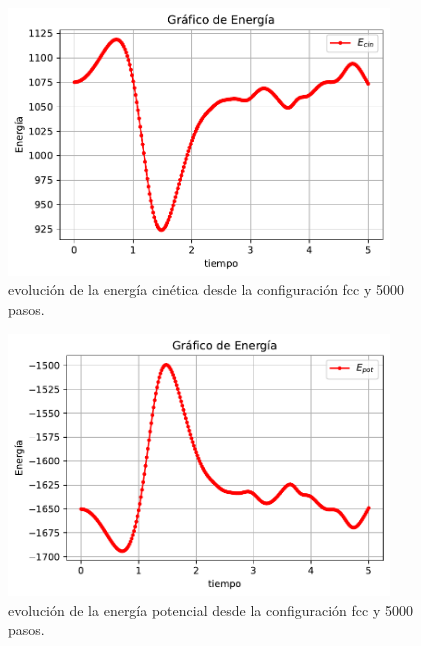 \documentclass[11pt]{article} %
\begin{document}
\begin{figure}[h!] \centering
	\includegraphics[width=0.9\textwidth]{../../Graficas/Ecin-equilibra.pdf}
	\caption{evolución de la energía cinética desde la configuración fcc y 5000 pasos.}
	\label{Fig:02}
\end{figure}	

\begin{figure}[h!] \centering
	\includegraphics[width=0.9\textwidth]{../../Graficas/Epot-equilibra.pdf}
	\caption{evolución de la energía potencial desde la configuración fcc y 5000 pasos.}
	\label{Fig:03}
\end{figure}	
\end{document}
